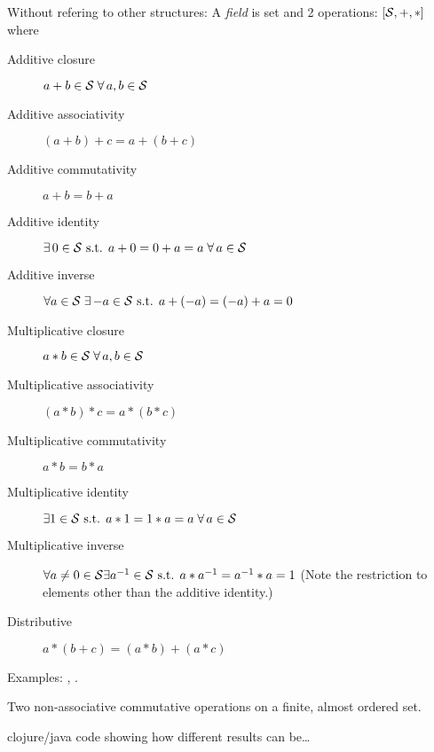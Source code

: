 Without refering to other structures:
A \textit{field} is set and 2 operations: 
$\left[ {\mathcal{S}}, +, * \right]$
where
\begin{description}
  \item[Additive closure] $a + b \in {\mathcal{S}} \; 
  \forall \, a,b \in {\mathcal{S}}$ 
  \item[Additive associativity] 
  $\left( a + b \right) + c = a + \left( b + c \right)$ 
  \item[Additive commutativity] $a + b = b + a$ 
  \item[Additive identity] $\exists \, 0 \in {\mathcal{S}} \text{ s.t. } 
  a + 0 = 0 + a = a \; \forall \, a \in {\mathcal{S}}$ 
  \item[Additive inverse] $\forall a \in {\mathcal{S}} \; 
  \exists \, {-a} \in {\mathcal{S}} 
  \text{ s.t. }  a + \left( -a \right) = \left( -a \right) + a = 0$ 
  \item[Multiplicative closure] $a * b \in {\mathcal{S}} \; \forall \,a,b \in {\mathcal{S}}$ 
  \item[Multiplicative associativity] 
  $\left( a * b \right) * c = a * \left( b * c \right)$ 
  \item[Multiplicative commutativity] $a * b = b * a$ 
  \item[Multiplicative identity] $\exists 1 \in {\mathcal{S}}
   \text{ s.t. } 
  a * 1 = 1 * a = a \; \forall \, a \in {\mathcal{S}}$ 
  \item[Multiplicative inverse] $\forall a \ne 0 \in {\mathcal{S}} 
  \exists a^{-1} \in {\mathcal{S}}
  \text{ s.t. }  a * a^{-1} = a^{-1} * a = 1$ 
  (Note the restriction to elements other than the additive identity.) 
  \item[Distributive] $a * \left( b + c \right) 
  = \left( a * b \right) + \left( a * c \right)$
\end{description}


Examples: 
, .


Two non-associative commutative operations on a finite,
almost ordered set.
\begin{example}

clojure/java code showing how different results can be\ldots
 
\end{example}

\cite{Higham2002ASNA,Muller-et-al-2010,Zhu:2010:A9O:1824801.1824815}

